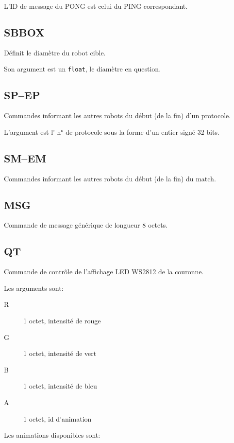	L'ID de message du PONG est celui du PING correspondant.

\subsection{SBBOX}
	\label{subsec:t:SBBOX}

	Définit le diamètre du robot cible.

	Son argument est un \verb|float|, le diamètre en question.

\subsection{SP--EP}
	\label{subsec:t:SP-EP}

	Commandes informant les autres robots du début (de la fin) d'un protocole.

	L'argument est l' n° de protocole sous la forme d'un entier signé 32 bits.

\subsection{SM--EM}
	\label{subsec:t:SM-EM}

	Commandes informant les autres robots du début (de la fin) du match.

\subsection{MSG}
	\label{subsec:t:MSG}

	Commande de message générique de longueur 8 octets.

\subsection{QT}
	\label{subsec:t:QT}

	Commande de contrôle de l'affichage LED WS2812 de la couronne.

	Les arguments sont:

	\begin{description}
		\item[R] 1 octet, intensité de rouge
		\item[G] 1 octet, intensité de vert
		\item[B] 1 octet, intensité de bleu
		\item[A] 1 octet, id d'animation
	\end{description}

	Les animations disponibles sont:

